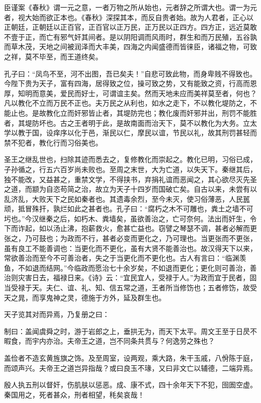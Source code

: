 \documentclass[]{article}
\begin{document}
臣谨案《春秋》谓一元之意，一者万物之所从始也，元者辞之所谓大也。谓一为元者，视大始而欲正本也。《春秋》深探其本，而反自贵者始。故为人君者，正心以正朝廷，正朝廷以正百官，正百官以正万民，正万民以正四方。四方正，远近莫敢不壹于正，而亡有邪气奸其间者。是以阴阳调而风雨时，群生和而万民殖，五谷孰而草木茂，天地之间被润泽而大丰美，四海之内闻盛德而皆徕臣，诸福之物，可致之祥，莫不毕至，而王道终矣。

孔子曰：``凤鸟不至，河不出图，吾已矣夫！''自悲可致此物，而身卑贱不得致也。今陛下贵为天子，富有四海，居得致之位，操可致之势，又有能致之资，行高而恩厚，知明而意美，爱民而好士，可谓谊主矣。然而天地未应而美祥莫至者，何也？凡以教化不立而万民不正也。夫万民之从利也，如水之走下，不以教化堤防之，不能止也。是故教化立而奸邪皆止者，其堤防完也；教化废而奸邪并出，刑罚不能胜者，其堤防坏也。古之王者明于此，是故南面而治天下，莫不以教化为大务。立太学以教于国，设痒序以化于邑，渐民以仁，摩民以谊，节民以礼，故其刑罚甚轻而禁不犯者，教化行而习俗美也。

圣王之继乱世也，扫除其迹而悉去之，复修教化而崇起之。教化已明，习俗已成，子孙循之，行五六百岁尚未败也。至周之末世，大为亡道，以失天下。秦继其后，独不能改，又益甚之，重禁文学，不得挟书，弃捐礼谊而恶闻之，其心欲尽灭先圣之道，而颛为自恣苟简之治，故立为天子十四岁而国破亡矣。自古以来，未尝有以乱济乱，大败天下之民如秦者也。其遗毒余烈，至今未灭，使习俗薄恶，人民嚚顽，抵冒殊扞，孰烂如此之甚者也。孔子曰：``腐朽之木不可雕也，粪土之墙不可圬也。''今汉继秦之后，如朽木、粪墙矣，虽欲善治之，亡可奈何。法出而奸生，令下而诈起，如以汤止沸，抱薪救火，愈甚亡益也。窃譬之琴瑟不调，甚者必解而更张之，乃可鼓也；为政而不行，甚者必变而更化之，乃可理也。当更张而不更张，虽有良工不能善调也：当更化而不更化，虽有大贤不能善治也。故汉得天下以来，常欲善治而至今不可善治者，失之于当更化而不更化也。古人有言曰：``临渊羡鱼，不如退而结网。''今临政而愿治七十余岁矣，不如退而更化；更化则可善治，善治则灾害日去，福禄日来。《诗》云：``宜民宜人，受禄于人。''为政而宜于民者，固当受禄于天。夫仁、谊、礼、知、信五常之道，王者所当修饬也；五者修饬，故受天之晁，而享鬼神之灵，德施于方外，延及群生也。

天子览其对而异焉，乃复册之曰：

制曰：盖闻虞舜之时，游于岩郎之上，垂拱无为，而天下太平。周文王至于日昃不暇食，而宇内亦治。夫帝王之道，岂不同条共贯与？何逸劳之殊也？

盖俭者不造玄黄旌旗之饰。及至周室，设两观，乘大路，朱干玉戚，八佾陈于庭，而颂声兴。夫帝王之道岂异指哉？或曰良玉不瑑，又曰非文亡以辅德，二端异焉。

殷人执五刑以督奸，伤肌肤以惩恶。成、康不式，四十余年天下不犯，囹圄空虚。秦国用之，死者甚众，刑者相望，秏矣哀哉！
\end{document}

